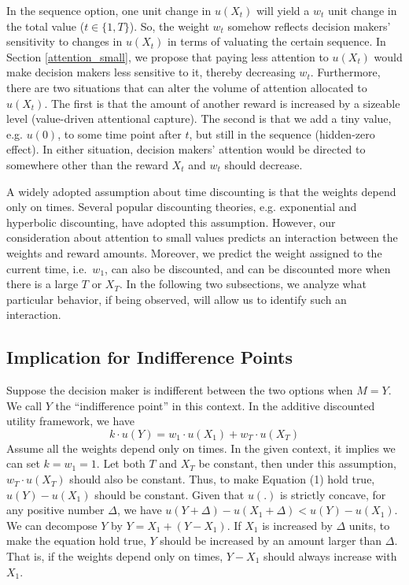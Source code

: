 \documentclass[
  12pt,
]{article}
\begin{document}
In the sequence option, one unit change in \(u(X_t)\) will yield a
\(w_t\) unit change in the total value (\(t\in\{1,T\}\)). So, the weight
\(w_t\) somehow reflects decision makers' sensitivity to changes in
\(u(X_t)\) in terms of valuating the certain sequence. In Section
\ref{attention_small}, we propose that paying less attention to
\(u(X_t)\) would make decision makers less sensitive to it, thereby
decreasing \(w_t\). Furthermore, there are two situations that can alter
the volume of attention allocated to \(u(X_t)\). The first is that the
amount of another reward is increased by a sizeable level (value-driven
attentional capture). The second is that we add a tiny value, e.g.
\(u(0)\), to some time point after \(t\), but still in the sequence
(hidden-zero effect). In either situation, decision makers' attention
would be directed to somewhere other than the reward \(X_t\) and \(w_t\)
should decrease.

A widely adopted assumption about time discounting is that the weights
depend only on times. Several popular discounting theories, e.g.
exponential and hyperbolic discounting, have adopted this assumption.
However, our consideration about attention to small values predicts an
interaction between the weights and reward amounts. Moreover, we predict
the weight assigned to the current time, i.e.~\(w_1\), can also be
discounted, and can be discounted more when there is a large \(T\) or
\(X_T\). In the following two subsections, we analyze what particular
behavior, if being observed, will allow us to identify such an
interaction.

\hypertarget{implication-for-indifference-points}{%
\subsection{\texorpdfstring{Implication for Indifference Points
\label{impli_indiff_point}}{Implication for Indifference Points }}\label{implication-for-indifference-points}}

Suppose the decision maker is indifferent between the two options when
\(M=Y\). We call \(Y\) the ``indifference point'' in this context. In
the additive discounted utility framework, we have
\[ k\cdot u(Y) = w_1 \cdot u(X_1) + w_T \cdot u(X_T) \]Assume all the
weights depend only on times. In the given context, it implies we can
set \(k= w_1= 1\). Let both \(T\) and \(X_T\) be constant, then under
this assumption, \(w_T\cdot u(X_T)\) should also be constant. Thus, to
make Equation (1) hold true, \(u(Y) - u(X_1)\) should be constant. Given
that \(u(.)\) is strictly concave, for any positive number \(\Delta\),
we have \(u(Y+\Delta) - u(X_1 + \Delta) < u(Y) - u(X_1)\). We can
decompose \(Y\) by \(Y = X_1+(Y -X_1)\). If \(X_1\) is increased by
\(\Delta\) units, to make the equation hold true, \(Y\) should be
increased by an amount larger than \(\Delta\). That is, if the weights
depend only on times, \(Y - X_1\) should always increase with \(X_1\).
\end{document}
